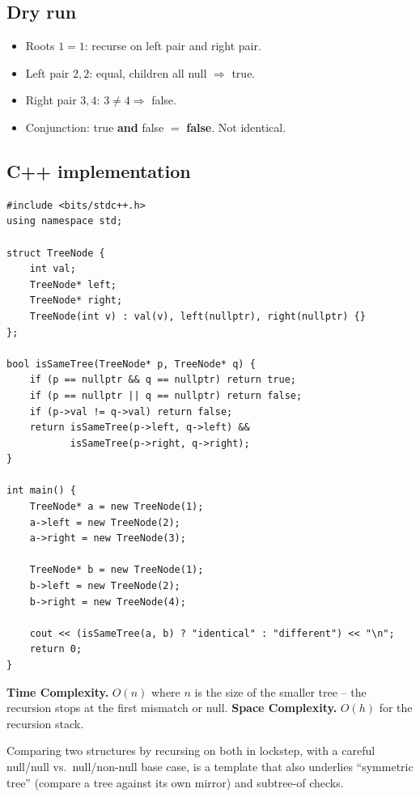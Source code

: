 \subsection*{Dry run}


\begin{itemize}
  \item Roots $1=1$: recurse on left pair and right pair.
  \item Left pair $2,2$: equal, children all null $\Rightarrow$ true.
  \item Right pair $3,4$: $3\ne4 \Rightarrow$ false.
  \item Conjunction: true \textbf{and} false $=$ \textbf{false}. Not
        identical.
\end{itemize}

\subsection*{C++ implementation}

\begin{lstlisting}
#include <bits/stdc++.h>
using namespace std;

struct TreeNode {
    int val;
    TreeNode* left;
    TreeNode* right;
    TreeNode(int v) : val(v), left(nullptr), right(nullptr) {}
};

bool isSameTree(TreeNode* p, TreeNode* q) {
    if (p == nullptr && q == nullptr) return true;
    if (p == nullptr || q == nullptr) return false;
    if (p->val != q->val) return false;
    return isSameTree(p->left, q->left) &&
           isSameTree(p->right, q->right);
}

int main() {
    TreeNode* a = new TreeNode(1);
    a->left = new TreeNode(2);
    a->right = new TreeNode(3);

    TreeNode* b = new TreeNode(1);
    b->left = new TreeNode(2);
    b->right = new TreeNode(4);

    cout << (isSameTree(a, b) ? "identical" : "different") << "\n";
    return 0;
}
\end{lstlisting}

\begin{complexitybox}
\textbf{Time Complexity.} $O(n)$ where $n$ is the size of the smaller
tree -- the recursion stops at the first mismatch or null. \textbf{Space
Complexity.} $O(h)$ for the recursion stack.
\end{complexitybox}

\begin{takeawaybox}
Comparing two structures by recursing on both in lockstep, with a careful
null/null vs.\ null/non-null base case, is a template that also underlies
``symmetric tree'' (compare a tree against its own mirror) and subtree-of
checks.
\end{takeawaybox}
